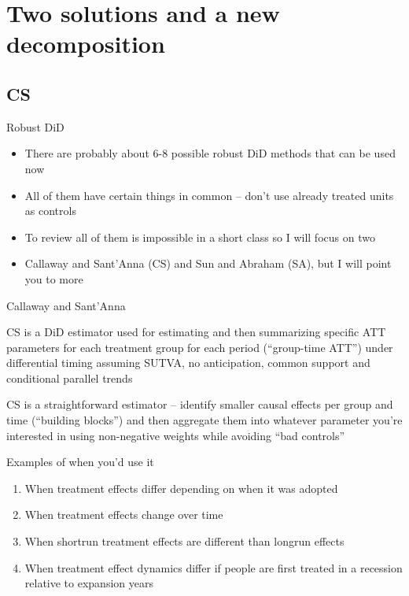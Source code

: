 \documentclass{beamer}
\begin{document}
\section{Two solutions and a new decomposition}

\subsection{CS}



\begin{frame}{Robust DiD}

\begin{itemize}

\item There are probably about 6-8 possible robust DiD methods that can be used now
\item All of them have certain things in common -- don't use already treated units as controls
\item To review all of them is impossible in a short class so I will focus on two
\item Callaway and Sant'Anna (CS) and Sun and Abraham (SA), but I will point you to more

\end{itemize}

\end{frame}

\begin{frame}{Callaway and Sant'Anna}



CS is a DiD estimator used for estimating and then summarizing specific ATT parameters for each treatment group for each period (``group-time ATT'') under differential timing assuming SUTVA, no anticipation, common support and conditional parallel trends

\bigskip

CS is a straightforward estimator -- identify smaller causal effects per group and time (``building blocks'') and then aggregate them into whatever parameter you're interested in using non-negative weights while avoiding ``bad controls''



\end{frame}


\begin{frame}{Examples of when you'd use it}

\begin{enumerate}
\item When treatment effects differ depending on when it was adopted
\item When treatment effects change over time
\item When shortrun treatment effects are different than longrun effects
\item When treatment effect dynamics differ if people are first treated in a recession relative to expansion years
\end{enumerate}

\bigskip


\end{frame}
\end{document}
